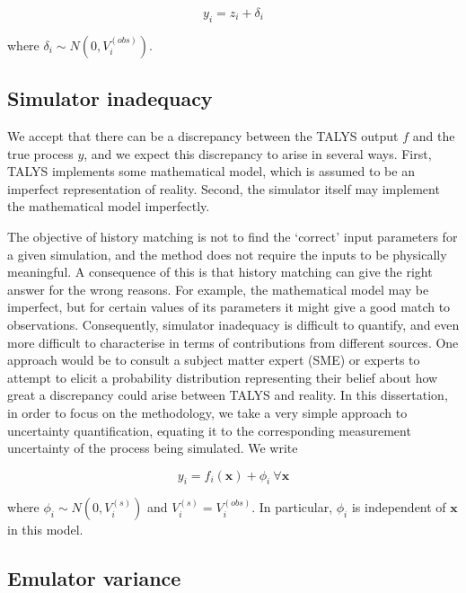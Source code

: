 \documentclass[
  12pt,
  a4paper,
  twoside]{book}
\begin{document}
\begin{equation}
\label{eq:observation-uncertainty}
y_i = z_i + \delta_i
\end{equation}

where \(\delta_i \sim N(0, V_i^{(obs)})\).

\hypertarget{simulator-inadequacy}{%
\subsection{Simulator inadequacy}\label{simulator-inadequacy}}

We accept that there can be a discrepancy between the TALYS output \(f\) and the true process \(y\), and we expect this discrepancy to arise in several ways. First, TALYS implements some mathematical model, which is assumed to be an imperfect representation of reality. Second, the simulator itself may implement the mathematical model imperfectly.

The objective of history matching is not to find the `correct' input parameters for a given simulation, and the method does not require the inputs to be physically meaningful. A consequence of this is that history matching can give the right answer for the wrong reasons. For example, the mathematical model may be imperfect, but for certain values of its parameters it might give a good match to observations. Consequently, simulator inadequacy is difficult to quantify, and even more difficult to characterise in terms of contributions from different sources. One approach would be to consult a subject matter expert (SME) or experts to attempt to elicit a probability distribution representing their belief about how great a discrepancy could arise between TALYS and reality. In this dissertation, in order to focus on the methodology, we take a very simple approach to uncertainty quantification, equating it to the corresponding measurement uncertainty of the process being simulated. We write

\begin{equation}
\label{eq:simulator-inadequacy}
y_i =  f_i(\mathbf{x}) + \phi_i ~ \forall \mathbf{x}
\end{equation}

where \(\phi_i \sim N(0,V_i^{(s)})\) and \(V_i^{(s)}=V_i^{(obs)}\). In particular, \(\phi_i\) is independent of \(\mathbf{x}\) in this model.

\hypertarget{emulator-variance}{%
\subsection{Emulator variance}\label{emulator-variance}}
\end{document}
